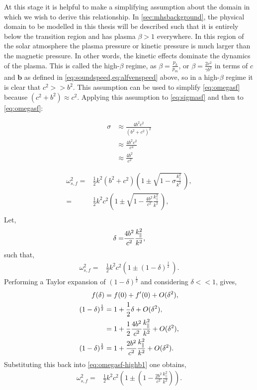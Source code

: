 \documentclass[a4paper,12pt,fourier,authoryear,custommargin]{Classes/PhDThesisPSnPDF}
\renewcommand{\vec}{\mathbf}
\begin{document}
At this stage it is helpful to make a simplifying assumption about the domain in which we wish to derive this relationship.
In \cref{sec:mhsbackground}, the physical domain to be modelled in this thesis will be described such that it is entirely below the transition region and has plasma $\beta > 1$ everywhere.
In this region of the solar atmosphere the plasma pressure or kinetic pressure is much larger than the magnetic pressure.
In other words, the kinetic effects dominate the dynamics of the plasma.
This is called the high-$\beta$ regime, as $\displaystyle\beta = \frac{p_k}{p_m}$, or $\displaystyle\beta = \frac{2c^2}{\gamma b^2}$ in terms of $c$ and $\vec{b}$ as defined in \cref{eq:soundspeed,eq:alfvenspeed} above, so in a high-$\beta$ regime it is clear that $c^2 >> b^2$.
This assumption can be used to simplify \cref{eq:omegasf} because $(c^2 + b^2) \approx c^2$.
Applying this assumption to \cref{eq:sigmasf} and then to \cref{eq:omegasf}:

\begin{align}
    \sigma &\approx \frac{4b^2c^2}{(b^2+c^2)^2}\\
           &\approx \frac{4b^2c^2}{c^4}\\
           &\approx \frac{4b^2}{c^2}
\end{align}

\begin{align}
    \omega^2_{s,f} =& \frac{1}{2}k^2(b^2+c^2)\left(1 \pm \sqrt{1 - \sigma \frac{k^2_\parallel}{k^2}}\,\right),\\
                   =& \frac{1}{2}k^2c^2\left(1 \pm \sqrt{1 - \frac{4b^2}{c^2} \frac{k^2_\parallel}{k^2}}\,\right),\\
\end{align}
Let,
\begin{align}
    \delta =& \frac{4b^2}{c^2} \frac{k^2_\parallel}{k^2},\notag\\
\end{align}
such that,
\begin{align}
    \omega^2_{s,f} =& \frac{1}{2}k^2c^2\left(1 \pm (1 - \delta)^{\frac{1}{2}}\,\right).\label{eq:omegasf-highb1}
\end{align}
Performing a Taylor expansion of $(1-\delta)^{\frac{1}{2}}$ and considering $\delta << 1$, gives,
\begin{align}
    f(\delta) &= f(0) + f^\prime(0) + O(\delta^2),\notag\\
    (1-\delta)^{\frac{1}{2}} &= 1 + \frac{1}{2}\delta + O(\delta^2),\\
                             &= 1 + \frac{1}{2}\frac{4b^2}{c^2} \frac{k^2_\parallel}{k^2} + O(\delta^2),\\
    (1-\delta)^{\frac{1}{2}} &= 1 + \frac{2b^2}{c^2} \frac{k^2_\parallel}{k^2} + O(\delta^2).
\end{align}
Substituting this back into \cref{eq:omegasf-highb1} one obtains,
\begin{align}
    \omega^2_{s,f} =& \frac{1}{2}k^2c^2\left(1 \pm \left(1 - \frac{2b^2}{c^2} \frac{k^2_\parallel}{k^2}\right)\right).
\end{align}
\end{document}
